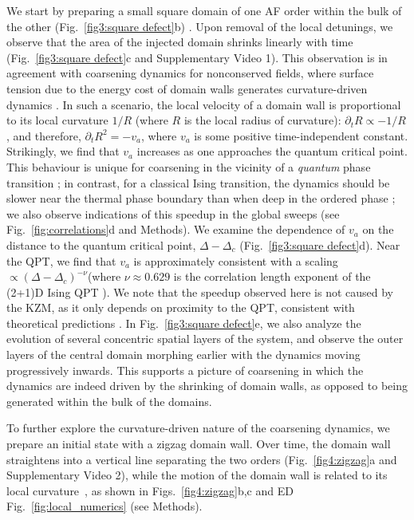 \documentclass[reprint,twocolumn,secnumarabic,amssymb, aps, prx]{revtex4-2}
\begin{document}
We start by preparing a small square domain of one AF order within the bulk of the other (Fig.~\ref{fig3:square defect}b) \cite{pavevsic2024constrained}. Upon removal of the local detunings, we observe that the area of the injected domain shrinks linearly with time (Fig.~\ref{fig3:square defect}c and Supplementary Video 1). This observation is in agreement with coarsening dynamics for nonconserved fields, where surface tension due to the energy cost of domain walls generates curvature-driven dynamics \cite{lifshitz1962kinetics,Bray1994}. In such a scenario, the local velocity of a domain wall is proportional to its local curvature $1/R$ (where $R$ is the local radius of curvature): $\partial_t R \propto -1/R$, and therefore, $\partial_t R^2 = -v_a$, where $v_a$ is some positive time-independent constant. 
Strikingly, we find that $v_a$ increases as one approaches the quantum critical point. This behaviour is unique for coarsening in the vicinity of a \textit{quantum} phase transition \cite{Samajdar2024}; in contrast, for a classical Ising transition, the dynamics should be slower near the thermal phase boundary than when deep in the ordered phase \cite{humayun1991non}; 
we also observe indications of this speedup in the global sweeps (see Fig.~\ref{fig:correlations}d and Methods). We examine the dependence of $v_a$ on the distance to the quantum critical point, $\Delta-\Delta_c$  (Fig.~\ref{fig3:square defect}d). Near the QPT, we find that $v_a$ is approximately consistent with a scaling $\propto(\Delta-\Delta_c)^{-\nu}$(where $\nu\approx 0.629$ is the correlation length exponent of the (2+1)D Ising QPT \cite{PhysRevLett.124.103601}). We note that the speedup observed here is not caused by the KZM, as it only depends on proximity to the QPT, consistent with theoretical predictions \cite{Samajdar2024}. In Fig.~\ref{fig3:square defect}e, we also analyze the evolution of several concentric spatial layers of the system, and observe the outer layers of the central domain morphing earlier with the dynamics moving progressively inwards. This supports a picture of coarsening in which the dynamics are indeed driven by the shrinking of domain walls, as opposed to being generated within the bulk of the domains. 

To further explore the curvature-driven nature of the coarsening dynamics, we prepare an initial state with a zigzag domain wall. Over time, the domain wall straightens into a vertical line separating the two orders (Fig.~\ref{fig4:zigzag}a and Supplementary Video 2), while  the motion of the domain wall is related to its local curvature~\cite{Samajdar2024}, as shown in Figs.~\ref{fig4:zigzag}b,c and ED Fig.~\ref{fig:local_numerics} (see Methods). 
\end{document}
